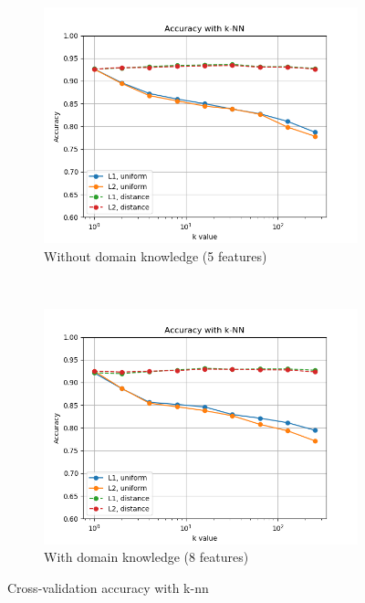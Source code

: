 \documentclass{article}
\begin{document}
\begin{figure}[h!]
    \centering
    \begin{subfigure}[b]{0.45\textwidth}
        \includegraphics[width=\textwidth]{../figures/wo_domain_knowledge/accuracy_knn.png}
        \caption{Without domain knowledge (5  features)}
        \label{fig:gull}
    \end{subfigure}
    ~ %
    \begin{subfigure}[b]{0.45\textwidth}
        \includegraphics[width=\textwidth]{../figures/w_domain_knowledge/accuracy_knn.png}
        \caption{With domain knowledge (8  features)}
        \label{fig:tiger}
    \end{subfigure}
    \caption{Cross-validation accuracy with k-nn}\label{fig:knn}
\end{figure}
\end{document}
